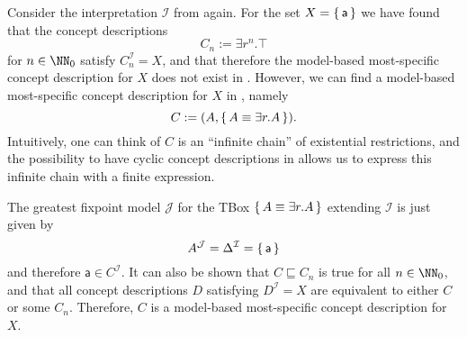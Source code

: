 \begin{Example}
  \label{expl:mmsc-exist-in-ELgfpbot}
  Consider the interpretation $\mathcal{I}$ from 
  again.  For the set $X = {\{\, \mathsf{a} \,\}}$ we have found that the concept descriptions
  \begin{equation*}
    C_n := \exists r^n. \top
  \end{equation*}
  for $n \in \NN_0$ satisfy $C_n^{\mathcal{I}} = X$, and that therefore the model-based
  most-specific concept description for $X$ does not exist in \ELbot.  However, we can
  find a model-based most-specific concept description for $X$ in \ELgfpbot, namely
  \begin{equation*}
    C := (A, {\{\, A \equiv \exists r. A \,\}}).
  \end{equation*}
  Intuitively, one can think of $C$ is an \enquote{infinite chain} of existential
  restrictions, and the possibility to have cyclic concept descriptions in \ELgfpbot
  allows us to express this infinite chain with a finite expression.

  The greatest fixpoint model $\mathcal{J}$ for the TBox ${\{\, A \equiv \exists r. A \,\}}$
  extending $\mathcal{I}$ is just given by
  \begin{equation*}
    A^{\mathcal{J}} = \Delta^{\mathcal{I}} = {\{\, \mathsf{a} \,\}}
  \end{equation*}
  and therefore $\mathsf{a} \in C^{\mathcal{I}}$.  It can also be shown that $C
  \sqsubseteq C_n$ is true for all $n \in \NN_0$, and that all \ELgfpbot concept
  descriptions $D$ satisfying $D^{\mathcal{I}} = X$ are equivalent to either $C$ or some
  $C_n$.  Therefore, $C$ is a model-based most-specific concept description for $X$.
\end{Example}

